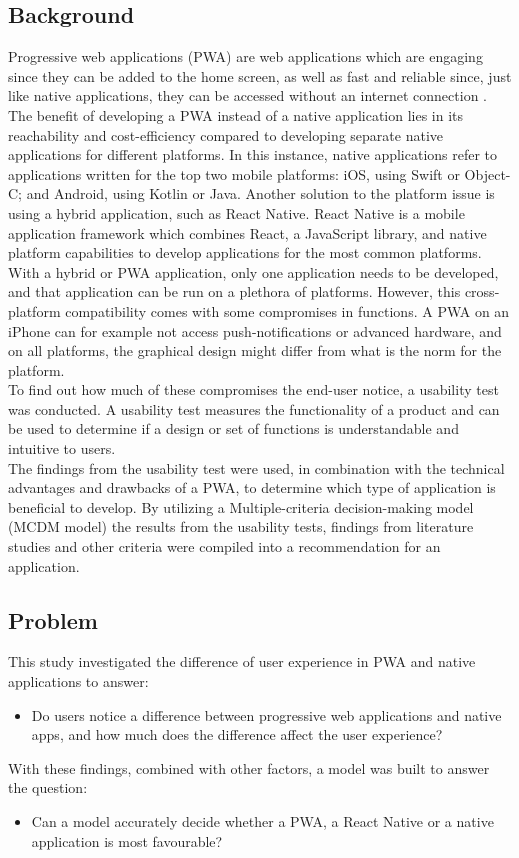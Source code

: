 \subsection{Background}
Progressive web applications (PWA) are web applications which are engaging since they can be added to the home screen, as well as fast and reliable since, just like native applications, they can be accessed without an internet connection \cite{PWAGoogle}. The benefit of developing a PWA instead of a native application lies in its reachability and cost-efficiency compared to developing separate native applications for different platforms. In this instance, native applications refer to applications written for the top two mobile platforms: iOS, using Swift or Object-C; and Android, using Kotlin or Java. Another solution to the platform issue is using a hybrid application, such as React Native. React Native is a mobile application framework which combines React, a JavaScript library, and native platform capabilities to develop applications for the most common platforms. \\
With a hybrid or PWA application, only one application needs to be developed, and that application can be run on a plethora of platforms. However, this cross-platform compatibility comes with some compromises in functions. A PWA on an iPhone can for example not access push-notifications or advanced hardware, and on all platforms, the graphical design might differ from what is the norm for the platform. \\
To find out how much of these compromises the end-user notice, a usability test was conducted. A usability test measures the functionality of a product and can be used to determine if a design or set of functions is understandable and intuitive to users. \\
The findings from the usability test were used, in combination with the technical advantages and drawbacks of a PWA, to determine which type of application is beneficial to develop. By utilizing a Multiple-criteria decision-making model (MCDM model) the results from the usability tests, findings from literature studies and other criteria were compiled into a recommendation for an application.

\subsection{Problem}

This study investigated the difference of user experience in PWA and native applications to answer:
\begin{itemize}
    \item Do users notice a difference between progressive web applications and native apps, and how much does the difference affect the user experience?
\end{itemize}
With these findings, combined with other factors, a model was built to answer the question:
\begin{itemize}
    \item Can a model accurately decide whether a PWA, a React Native or a native application is most favourable?
\end{itemize}



